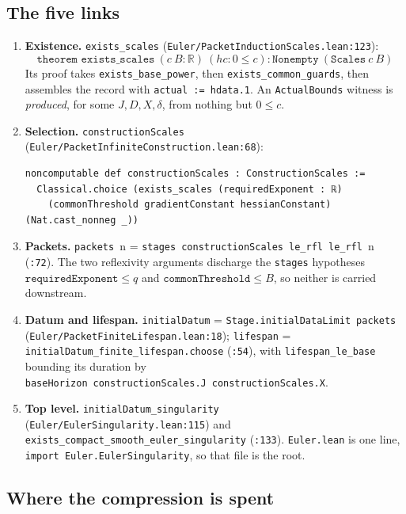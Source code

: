\documentclass[11pt]{article}
\newcommand{\R}{\mathbb{R}}
\newcommand{\ct}[1]{\texttt{#1}}
\newcommand{\file}[1]{\texttt{\small #1}}
\theoremstyle{plain}
\theoremstyle{definition}
\theoremstyle{remark}
\begin{document}
\subsection{The five links}

\begin{enumerate}
\item \textbf{Existence.} \ct{exists\_scales}
(\file{Euler/PacketInductionScales.lean:123}):
\[
  \ct{theorem exists\_scales}\ (c\ B:\R)\ (hc: 0\le c) : \ct{Nonempty}\ (\ct{Scales}\ c\ B)
\]
Its proof takes \ct{exists\_base\_power}, then
\ct{exists\_common\_guards}, then assembles the record with
\ct{actual := hdata.1}. An \ct{ActualBounds} witness is \emph{produced}, for some
$J,D,X,\delta$, from nothing but $0\le c$.
\item \textbf{Selection.} \ct{constructionScales}
(\file{Euler/PacketInfiniteConstruction.lean:68}):
\begin{lstlisting}
noncomputable def constructionScales : ConstructionScales :=
  Classical.choice (exists_scales (requiredExponent : ℝ)
    (commonThreshold gradientConstant hessianConstant) (Nat.cast_nonneg _))
\end{lstlisting}
\item \textbf{Packets.} \ct{packets}\ n = \ct{stages}\ \ct{constructionScales}\ \ct{le\_rfl}\ \ct{le\_rfl}\ n
(\file{:72}). The two reflexivity arguments discharge the \ct{stages} hypotheses
$\ct{requiredExponent}\le q$ and $\ct{commonThreshold}\le B$, so neither is
carried downstream.
\item \textbf{Datum and lifespan.} \ct{initialDatum} =
\ct{Stage.initialDataLimit}\ \ct{packets} (\file{Euler/PacketFiniteLifespan.lean:18});
\ct{lifespan} = \ct{initialDatum\_finite\_lifespan.choose} (\file{:54}), with
\ct{lifespan\_le\_base} bounding its duration by
\ct{baseHorizon}\ \ct{constructionScales.J}\ \ct{constructionScales.X}.
\item \textbf{Top level.} \ct{initialDatum\_singularity}
(\file{Euler/EulerSingularity.lean:115}) and
\ct{exists\_compact\_smooth\_euler\_singularity} (\file{:133}).
\file{Euler.lean} is one line, \ct{import Euler.EulerSingularity}, so that file
is the root.
\end{enumerate}

\subsection{Where the compression is spent}
\end{document}
